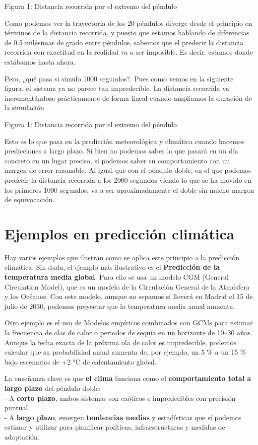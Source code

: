 \documentclass[
  10pt,
  a4paper,
  DIV=11,
  numbers=noendperiod,
  open=any]{scrreprt}
\numberwithin{equation}{chapter}
\numberwithin{equation}{section}
\renewcommand{\[}{\begin{equation}}
\renewcommand{\]}{\end{equation}}
\begin{document}
Figura 1: Distancia recorrida por el extremo del péndulo

Como podemos ver la trayectoria de los 20 péndulos diverge desde el
principio en términos de la distancia recorrida, y puesto que estamos
hablando de diferencias de 0.5 milésimas de grado entre péndulos,
sabemos que el predecir la distancia recorrida con exactitud en la
realidad va a ser imposible. Es decir, estamos donde estábamos hasta
ahora.

Pero, ¿qué pasa si simulo 1000 segundos?. Pues como vemos en la
siguiente figura, el sistema ya no parece tan impredecible. La distancia
recorrida va incrementándose prácticamente de forma lineal cuando
ampliamos la duración de la simulación.

Figura 1: Distancia recorrida por el extremo del péndulo

Esto es lo que pasa en la predicción meteorológica y climática cuando
hacemos predicciones a largo plazo. Si bien no podemos saber lo que
pasará en un día concreto en un lugar preciso, sí podemos saber su
comportamiento con un margen de error razonable. Al igual que con el
péndulo doble, en el que podemos predecir la distancia recorrida a los
2000 segundos viendo lo que se ha movido en los primeros 1000 segundos:
va a ser aproximadamente el doble sin mucho margen de equivocación.

\section{Ejemplos en predicción
climática}\label{ejemplos-en-predicciuxf3n-climuxe1tica}

Hay varios ejemplos que ilustran como se aplica este principio a la
predicción climática. Sin duda, el ejemplo más ilustrativo es el
\textbf{Predicción de la temperatura media global}. Para ello se usa un
modelo CGM (General Circulation Model), que es un modelo de la
Circulación General de la Atmósfera y los Océanos. Con este modelo,
aunque no sepamos si lloverá en Madrid el 15 de julio de 2030, podemos
proyectar que la temperatura media anual aumente.

Otro ejemplo es el uso de Modelos empíricos combinados con GCMs para
estimar la frecuencia de olas de calor o periodos de sequía en un
horizonte de 10--30 años. Aunque la fecha exacta de la próxima ola de
calor es impredecible, podemos calcular que su probabilidad anual
aumenta de, por ejemplo, un 5 \% a un 15 \% bajo escenarios de +2 °C de
calentamiento global.

La enseñanza clave es que \textbf{el clima} funciona como el
\textbf{comportamiento total a largo plazo} del péndulo doble:\\
- A \textbf{corto plazo}, ambos sistemas son caóticos e impredecibles
con precisión puntual.\\
- A \textbf{largo plazo}, emergen \textbf{tendencias medias} y
estadísticas que sí podemos estimar y utilizar para planificar
políticas, infraestructuras y medidas de adaptación.
\end{document}
